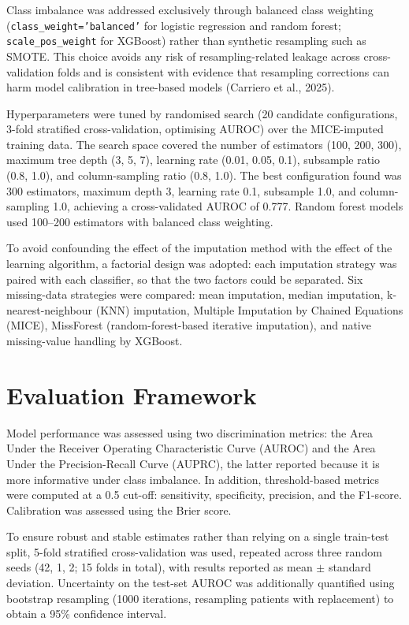 \documentclass[12pt,a4paper]{report}
\begin{document}
\label{sec:class-imbalance-method}
Class imbalance was addressed exclusively through balanced class weighting (\texttt{class\_weight='balanced'} for logistic regression and random forest; \texttt{scale\_pos\_weight} for XGBoost) rather than synthetic resampling such as SMOTE. This choice avoids any risk of resampling-related leakage across cross-validation folds and is consistent with evidence that resampling corrections can harm model calibration in tree-based models (Carriero et al., 2025).

Hyperparameters were tuned by randomised search (20 candidate configurations, 3-fold stratified cross-validation, optimising AUROC) over the MICE-imputed training data. The search space covered the number of estimators (100, 200, 300), maximum tree depth (3, 5, 7), learning rate (0.01, 0.05, 0.1), subsample ratio (0.8, 1.0), and column-sampling ratio (0.8, 1.0). The best configuration found was 300 estimators, maximum depth 3, learning rate 0.1, subsample 1.0, and column-sampling 1.0, achieving a cross-validated AUROC of 0.777. Random forest models used 100--200 estimators with balanced class weighting.

To avoid confounding the effect of the imputation method with the effect of the learning algorithm, a factorial design was adopted: each imputation strategy was paired with each classifier, so that the two factors could be separated. Six missing-data strategies were compared: mean imputation, median imputation, k-nearest-neighbour (KNN) imputation, Multiple Imputation by Chained Equations (MICE), MissForest (random-forest-based iterative imputation), and native missing-value handling by XGBoost.


\section{Evaluation Framework}
Model performance was assessed using two discrimination metrics: the Area Under the Receiver Operating Characteristic Curve (AUROC) and the Area Under the Precision-Recall Curve (AUPRC), the latter reported because it is more informative under class imbalance. In addition, threshold-based metrics were computed at a 0.5 cut-off: sensitivity, specificity, precision, and the F1-score. Calibration was assessed using the Brier score.

To ensure robust and stable estimates rather than relying on a single train-test split, 5-fold stratified cross-validation was used, repeated across three random seeds (42, 1, 2; 15 folds in total), with results reported as mean $\pm$ standard deviation. Uncertainty on the test-set AUROC was additionally quantified using bootstrap resampling (1000 iterations, resampling patients with replacement) to obtain a 95\% confidence interval.
\end{document}
